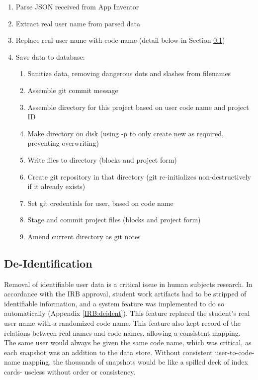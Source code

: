 \begin{enumerate}
\item Parse JSON received from App Inventor
\item Extract real user name from parsed data
\item Replace real user name with code name (detail below in Section \ref{sec:deident})
\item Save data to database:
\begin{enumerate}
	\item Sanitize data, removing dangerous dots and slashes from filenames
	\item Assemble git commit message
	\item Assemble directory for this project based on user code name and project ID
	\item Make directory on disk (using -p to only create new as required, preventing overwriting)
	\item Write files to directory (blocks and project form)
	\item Create git repository in that directory (git re-initializes non-destructively if it already exists)
	\item Set git credentials for user, based on code name
	\item Stage and commit project files (blocks and project form)
	\item Amend current directory as git notes
\end{enumerate}
\end{enumerate}

\subsection{De-Identification}
\label{sec:deident}
Removal of identifiable user data is a critical issue in human subjects research. In accordance with the IRB approval, student work artifacts had to be stripped of identifiable information, and a system feature was implemented to do so automatically (Appendix \ref{IRB:deident}). This feature replaced the student's real user name with a randomized code name. This feature also kept record of the relations between real names and code names, allowing a consistent mapping. The same user would always be given the same code name, which was critical, as each snapshot was an addition to the data store. Without consistent user-to-code-name mapping, the thousands of snapshots would be like a spilled deck of index cards- useless without order or consistency. 

